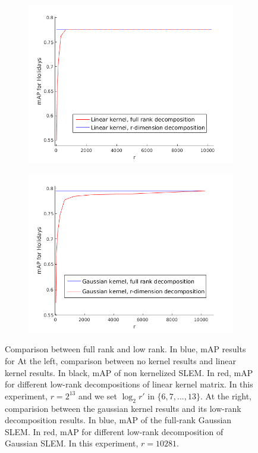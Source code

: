\begin{figure}[!h]
\centering
\begin{subfigure}[b]{0.48\textwidth}
\includegraphics[width=\textwidth]{linear_decomposition_nolog.png}
\end{subfigure}
\begin{subfigure}[b]{0.48\textwidth}
\includegraphics[width=\textwidth]{rbf_decomposition_nolog.png}
\end{subfigure}
\caption{Comparison between full rank and low rank. In blue, mAP results for 
At the left, comparison between no kernel results and linear kernel results. In black, mAP of non kernelized SLEM. In red, mAP for different low-rank decompositions of linear kernel matrix. In this experiment, $r=2^{13}$ and we set $\log_2 r'$ in $\{6, 7,...,13\}$. At the right, comparision between the gaussian kernel results and its low-rank decomposition results. In blue, mAP of the full-rank Gaussian SLEM. In red, mAP for different low-rank decomposition of Gaussian SLEM. In this experiment, $r=10281$.}
\label{no.ker.vs.linear2}
\end{figure}

